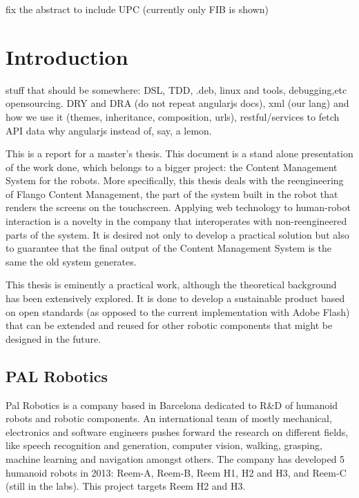 
fix the abstract to include UPC (currently only FIB is shown)

\chapter{Introduction}
stuff that should be somewhere: DSL, TDD, .deb, linux and tools, debugging,etc opensourcing. DRY and DRA (do not repeat angularjs docs), xml (our lang) and how we use it (themes, inheritance, composition, urls), restful/services to fetch API data
why angularjs instead of, say, a lemon.

This is a report for a master's thesis.
This document is a stand alone presentation of the work done, which belongs to a bigger project: the Content Management System for the robots.
More specifically, this thesis deals with the reengineering of Flango Content Management, the part of the system built in the robot that renders the screens on the touchscreen.
Applying web technology to human-robot interaction is a novelty in the company that interoperates with non-reengineered parts of the system.
It is desired not only to develop a practical solution but also to guarantee that the final output of the Content Management System is the same the old system generates.

This thesis is eminently a practical work, although the theoretical background has been extensively explored. 
It is done to develop a sustainable product based on open standards (as opposed to the current implementation with Adobe Flash) that can be extended and reused for other robotic components that might be designed in the future.

\section{PAL Robotics}
Pal Robotics is a company based in Barcelona dedicated to R\&D of humanoid robots and robotic components. 
An international team of mostly mechanical, electronics and software engineers pushes forward the research on different fields, like speech recognition and generation, computer vision, walking, grasping, machine learning and navigation amongst others.
The company has developed 5 humanoid robots in 2013: Reem-A, Reem-B, Reem H1, H2 and H3, and Reem-C (still in the labs).
This project targets Reem H2 and H3.

